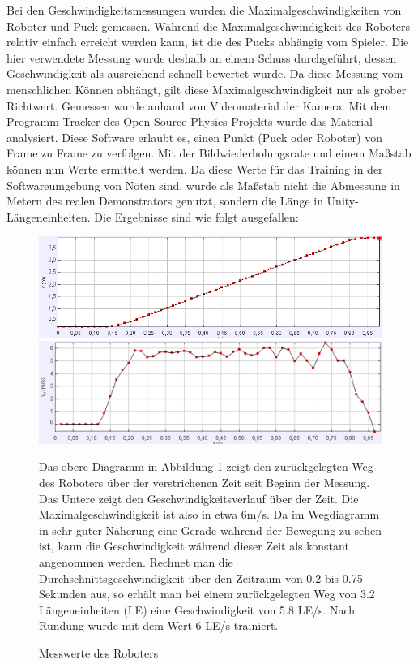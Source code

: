 Bei den Geschwindigkeitsmessungen wurden die Maximalgeschwindigkeiten von Roboter und Puck gemessen. Während die Maximalgeschwindigkeit des Roboters relativ einfach erreicht werden kann, ist die des Pucks abhängig vom Spieler. Die hier verwendete Messung wurde deshalb an einem Schuss durchgeführt, dessen Geschwindigkeit als ausreichend schnell bewertet wurde.  Da diese Messung vom menschlichen Können abhängt, gilt diese Maximalgeschwindigkeit nur als grober Richtwert. Gemessen wurde anhand von Videomaterial der Kamera. Mit dem Programm Tracker des Open Source Physics Projekts \cite{tracker} wurde das Material analysiert. Diese Software erlaubt es, einen Punkt (Puck oder Roboter) von Frame zu Frame zu verfolgen. Mit der Bildwiederholungsrate und einem Maßstab können nun Werte ermittelt werden. Da diese Werte für das Training in der Softwareumgebung von Nöten sind, wurde als Maßstab nicht die Abmessung in Metern des realen Demonstrators genutzt, sondern die Länge in Unity-Längeneinheiten. Die Ergebnisse sind wie folgt ausgefallen:\\
\begin{figure}
\includegraphics[width=\textwidth]{images/messung_robo_x}
\includegraphics[width=\textwidth]{images/messung_robo_v}
 \caption{Messwerte des Roboters }
 \label{mess_robo}

Das obere Diagramm in Abbildung \ref{mess_robo} zeigt den zurückgelegten Weg des Roboters über der verstrichenen Zeit seit Beginn der Messung. Das Untere zeigt den Geschwindigkeitsverlauf über der Zeit. Die Maximalgeschwindigkeit ist also in etwa 6m/s. Da im Wegdiagramm in sehr guter Näherung eine Gerade während der Bewegung zu sehen ist, kann die Geschwindigkeit während dieser Zeit als konstant angenommen werden. Rechnet man die Durchschnittsgeschwindigkeit über den Zeitraum von 0.2 bis 0.75 Sekunden aus, so erhält man bei einem zurückgelegten Weg von 3.2 Längeneinheiten (LE) eine Geschwindigkeit von 5.8 LE/s. Nach Rundung wurde mit dem Wert 6 LE/s trainiert.
\end{figure}

